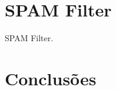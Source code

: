 \documentclass[a4paper,11pt,openright,oneside]{report}
\begin{document}

\chapter{SPAM Filter}
\label{chap.spamfilter}

SPAM Filter.

\chapter{Conclusões}
\label{chap.conclusões}

\maketitle
\nocite{*}
\printbibliography[title={Referências}]
\end{document}
